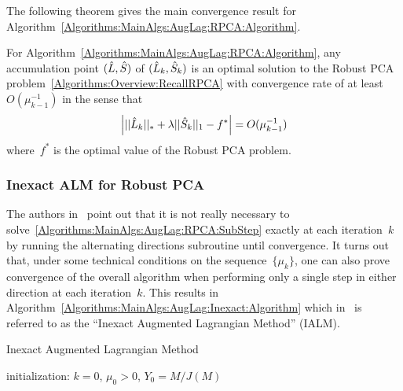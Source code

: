 \documentclass{../../common/projectreport}
\begin{document}
The following theorem gives the main convergence result for Algorithm~\ref{Algorithms:MainAlgs:AugLag:RPCA:Algorithm}.\\

\begin{theorem}
For Algorithm~\ref{Algorithms:MainAlgs:AugLag:RPCA:Algorithm}, any accumulation point $({\hat{L}},{\hat{S}})$ of $({\hat{L}}_k,{\hat{S}}_k)$ is an optimal solution to the Robust PCA problem~\eqref{Algorithms:Overview:RecallRPCA} with convergence rate of at least~$O(\mu_{k-1}^{-1})$ in the sense that
\begin{align*}
\left| ||{\hat{L}}_k||_* + \lambda ||{\hat{S}}_k||_1 - f^* \right| = O(\mu_{k-1}^{-1})
\end{align*}
where~$f^*$ is the optimal value of the Robust PCA problem.
\end{theorem}



\subsubsection{Inexact ALM for Robust PCA}
\label{Algorithms:MainAlgs:AugLag:Inexact:Subsubsec}

The authors in~\cite{Lin:2010fk} point out that it is not really necessary to solve~\eqref{Algorithms:MainAlgs:AugLag:RPCA:SubStep} exactly at each iteration~$k$ by running the alternating directions subroutine until convergence. It turns out that, under some technical conditions on the sequence~$\{\mu_k\}$, one can also prove convergence of the overall algorithm when performing only a single step in either direction at each iteration~$k$.  This results in Algorithm~\ref{Algorithms:MainAlgs:AugLag:Inexact:Algorithm} which in~\cite{Lin:2010fk} is referred to as the ``Inexact Augmented Lagrangian Method'' (IALM).

\begin{algorithm}
\caption{Inexact Augmented Lagrangian Method}
initialization: $k=0$, $\mu_0>0$, $Y_0 = M/J(M)$\;
\label{Algorithms:MainAlgs:AugLag:Inexact:Algorithm}
\end{algorithm}
\end{document}
